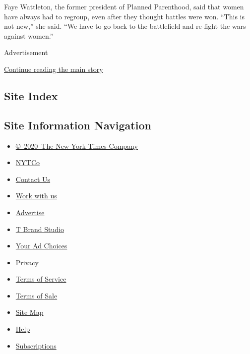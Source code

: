 Faye Wattleton, the former president of Planned Parenthood, said that
women have always had to regroup, even after they thought battles were
won. ``This is not new,'' she said. ``We have to go back to the
battlefield and re-fight the wars against women.''

Advertisement

\protect\hyperlink{after-bottom}{Continue reading the main story}

\hypertarget{site-index}{%
\subsection{Site Index}\label{site-index}}

\hypertarget{site-information-navigation}{%
\subsection{Site Information
Navigation}\label{site-information-navigation}}

\begin{itemize}
\tightlist
\item
  \href{https://help.nytimes3xbfgragh.onion/hc/en-us/articles/115014792127-Copyright-notice}{©~2020~The
  New York Times Company}
\end{itemize}

\begin{itemize}
\tightlist
\item
  \href{https://www.nytco.com/}{NYTCo}
\item
  \href{https://help.nytimes3xbfgragh.onion/hc/en-us/articles/115015385887-Contact-Us}{Contact
  Us}
\item
  \href{https://www.nytco.com/careers/}{Work with us}
\item
  \href{https://nytmediakit.com/}{Advertise}
\item
  \href{http://www.tbrandstudio.com/}{T Brand Studio}
\item
  \href{https://www.nytimes3xbfgragh.onion/privacy/cookie-policy\#how-do-i-manage-trackers}{Your
  Ad Choices}
\item
  \href{https://www.nytimes3xbfgragh.onion/privacy}{Privacy}
\item
  \href{https://help.nytimes3xbfgragh.onion/hc/en-us/articles/115014893428-Terms-of-service}{Terms
  of Service}
\item
  \href{https://help.nytimes3xbfgragh.onion/hc/en-us/articles/115014893968-Terms-of-sale}{Terms
  of Sale}
\item
  \href{https://spiderbites.nytimes3xbfgragh.onion}{Site Map}
\item
  \href{https://help.nytimes3xbfgragh.onion/hc/en-us}{Help}
\item
  \href{https://www.nytimes3xbfgragh.onion/subscription?campaignId=37WXW}{Subscriptions}
\end{itemize}
